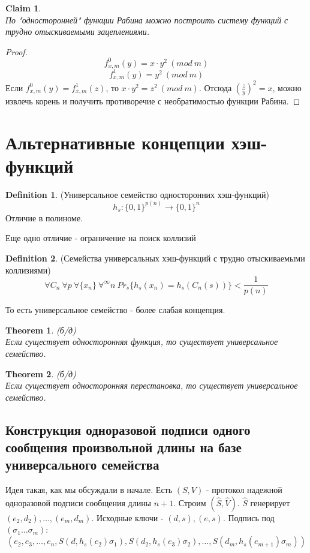 \documentclass[a4paper]{article}
\theoremstyle{definition}
\newtheorem{definition}{Definition}
\theoremstyle{plain}
\newtheorem{theorem}{Theorem}
\newtheorem{claim}{Claim}
\begin{document}
\begin{claim}~\\
	По "односторонней" функции Рабина можно построить систему функций с трудно
	отыскиваемыми зацеплениями.
\end{claim}

\begin{proof}~\\
	$$
		f_{x, m}^0(y) = x \cdot y^2\ (mod\ m)	
	$$
	$$
		f_{x, m}^1(y) = y^2\ (mod\ m)	
	$$
	Если $f_{x, m}^0(y) = f_{x, m}^1(z)$, то $x\cdot y^2 = z^2\ (mod\ m)$.
	Отсюда $(\frac{z}{y})^2 = x$, можно извлечь корень и получить противоречие с необратимостью
	функции Рабина.
\end{proof}

\section{Альтернативные концепции хэш-функций}

\begin{definition} (Универсальное семейство односторонних хэш-функций)~\\
	$$
		h_s\colon \{0, 1\}^{p(n)} \rightarrow \{0, 1\}^n	
	$$
	Отличие в полиноме.
\end{definition}

\noindent Еще одно отличие - ограничение на поиск коллизий
\begin{definition} (Семейства универсальных хэш-функций с трудно отыскиваемыми коллизиями)
	$$
		\forall C_n\ \forall p\ \forall \{x_n\}\ \forall^{\infty} n\ Pr_s\{h_s(x_n) = h_s(C_n(s))\} < \frac{1}{p(n)}	
	$$
\end{definition}

\noindent То есть универсальное семейство - более слабая концепция.

\begin{theorem} (б/д)~\\
	Если существует односторонняя функция, то существует универсальное семейство.
\end{theorem}

\begin{theorem} (б/д)~\\
	Если существует односторонняя перестановка, то существует универсальное семейство.
\end{theorem}

\subsection{Конструкция одноразовой подписи одного сообщения произвольной длины на базе универсального семейства}

Идея такая, как мы обсуждали в начале. Есть $(S, V)$ - протокол надежной
одноразовой подписи сообщения длины $n + 1$. Строим $(\hat{S}, \hat{V})$.
$\hat{S}$ генерирует $(e_2, d_2), \ldots, (e_m, d_m)$. Исходные ключи - $(d, s), (e, s)$.
Подпись под $(\sigma_1 \ldots \sigma_m)$:
$$
	(e_2, e_3, \ldots, e_n, S(d, h_s(e_2)\sigma_1), S(d_2, h_s(e_3)\sigma_2), \ldots, S(d_m ,h_s(e_{m + 1})\sigma_m))
$$
\end{document}
